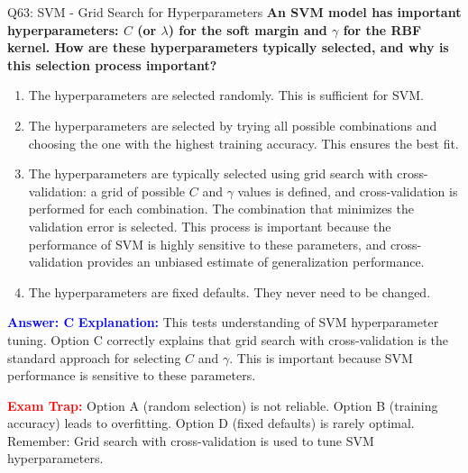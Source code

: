 \documentclass[8pt]{beamer}
\begin{document}
	\begin{frame}{Q63: SVM - Grid Search for Hyperparameters}
		\fontsize{6.5}{7.5}\selectfont
		\textbf{An SVM model has important hyperparameters: $C$ (or $\lambda$) for the soft margin and $\gamma$ for the RBF kernel. How are these hyperparameters typically selected, and why is this selection process important?}
		
		\begin{enumerate}
			\item The hyperparameters are selected randomly. This is sufficient for SVM.
			\item The hyperparameters are selected by trying all possible combinations and choosing the one with the highest training accuracy. This ensures the best fit.
			\item The hyperparameters are typically selected using grid search with cross-validation: a grid of possible $C$ and $\gamma$ values is defined, and cross-validation is performed for each combination. The combination that minimizes the validation error is selected. This process is important because the performance of SVM is highly sensitive to these parameters, and cross-validation provides an unbiased estimate of generalization performance.
			\item The hyperparameters are fixed defaults. They never need to be changed.
		\end{enumerate}
		
		\vspace{0.1cm}
		\textcolor{blue}{\textbf{Answer: C}}
		\vspace{0.1cm}
		\textcolor{blue}{\textbf{Explanation:}} This tests understanding of SVM hyperparameter tuning. Option C correctly explains that grid search with cross-validation is the standard approach for selecting $C$ and $\gamma$. This is important because SVM performance is sensitive to these parameters.
		
		\textcolor{red}{\textbf{Exam Trap:}} Option A (random selection) is not reliable. Option B (training accuracy) leads to overfitting. Option D (fixed defaults) is rarely optimal. Remember: Grid search with cross-validation is used to tune SVM hyperparameters.
	\end{frame}
	
\end{document}
